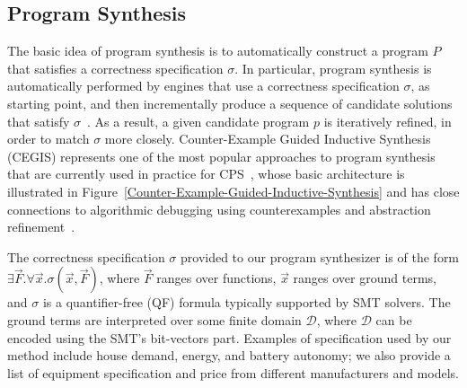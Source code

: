 \documentclass[10pt,conference]{IEEEtran}
\begin{document}
\subsection{Program Synthesis}
\label{sec:ProgramSynthesis}
%
The basic idea of program synthesis is to automatically construct a program $P$ that satisfies a correctness specification $\sigma$. In particular, program synthesis is automatically performed by engines that use a correctness specification $\sigma$, as starting point, and then incrementally produce a sequence of candidate solutions that satisfy $\sigma$~\cite{Abateetal2017}. As a result, a given candidate program $p$ is iteratively refined, in order to match $\sigma$ more closely. Counter-Example Guided Inductive Synthesis (CEGIS) represents one of the most popular approaches to program synthesis that are currently used in practice for CPS~\cite{Abateetal2017}, whose basic architecture is illustrated in Figure~\ref{Counter-Example-Guided-Inductive-Synthesis} and has close connections to algorithmic debugging using counterexamples and abstraction refinement~\cite{Alur13}. 

The correctness specification $\sigma$ provided to our program synthesizer is of the form $\exists \vec{F} .  \forall \vec{x}.  \sigma(\vec{x}, \vec{F})$, where $\vec{F}$ ranges over functions, $\vec{x}$ ranges over ground terms, and $\sigma$ is a quantifier-free (QF) formula typically supported by SMT solvers. The ground terms are interpreted over some finite domain $\mathcal{D}$, where $\mathcal{D}$ can be encoded using the SMT's bit-vectors part. Examples of specification used by our method include house demand, energy, and battery autonomy; we also provide a list of equipment specification and price from different manufacturers and models.
\end{document}
